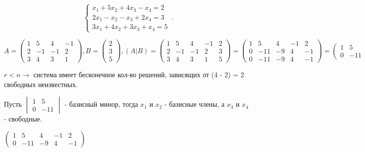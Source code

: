 \documentclass{article}
\begin{document}
\begin{equation}
    \begin{cases}
        x_1 + 5x_2 + 4x_3 - x_4 = 2 \\
        2x_1 - x_2 - x_3 + 2x_4 = 3 \\
        3x_1 + 4x_2 + 3x_3 + x_4 = 5
    \end{cases}\,.
\end{equation}

$A = \begin{pmatrix}
    1 & 5 & 4 & -1 \\
    2 & -1 & -1 & 2 \\
    3 & 4 & 3 & 1
\end{pmatrix}, B = \begin{pmatrix}
    2 \\
    3 \\
    5
\end{pmatrix}, (A|B) = \begin{pmatrix}
    1 & 5 & 4 & -1 & 2 \\
    2 & -1 & -1 & 2 & 3 \\
    3 & 4 & 3 & 1 & 5
\end{pmatrix} = \begin{pmatrix}
    1 & 5 & 4 & -1 & 2 \\
    0 & -11 & -9 & 4 & -1 \\
    0 & -11 & -9 & 4 & -1
\end{pmatrix} = \begin{pmatrix}
    1 & 5 & 4 & -1 & 2 \\
    0 & -11 & -9 & 4 & -1
\end{pmatrix}, \begin{vmatrix} 1 & -5 \\ 0 & -11 \end{vmatrix} = -11 \ne 0, r(A|B) = 2 = r(A)$

$r < n \rightarrow$ система имеет бесконечное кол-во решений, зависящих от (4 - 2) = 2 свободных неизвестных.

Пусть $\begin{vmatrix}
    1 & 5 \\
    0 & -11
\end{vmatrix}$ - базисный минор, тогда $x_1$ и $x_2$ - базисные члены, а $x_3$ и $x_4$ - свободные.

$
\begin{pmatrix}
    1 & 5 & 4 & -1 & 2 \\
    0 & -11 & -9 & 4 & -1
\end{pmatrix}
$
\end{document}
